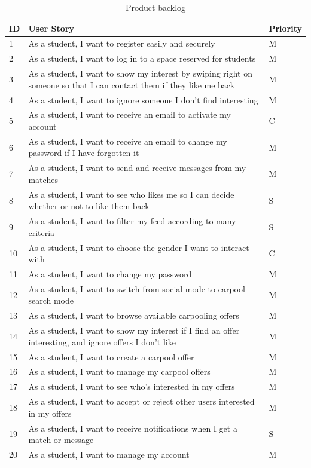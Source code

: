 \begin{table}[H]
    \centering
    \begin{tabular}{|p{0.5cm}|p{12cm}|p{2cm}|}
        \hline
ID & User Story & Priority \\
\hline
1 & As a student, I want to register easily and securely & M \\
\hline
2 & As a student, I want to log in to a space reserved for students & M \\
\hline
3 & As a student, I want to show my interest by swiping right on someone so that I can contact them if they like me back & M \\
\hline
4 & As a student, I want to ignore someone I don't find interesting & M \\
\hline
5 & As a student, I want to receive an email to activate my account & C \\
\hline
6 & As a student, I want to receive an email to change my password if I have forgotten it & M \\
\hline
7 & As a student, I want to send and receive messages from my matches & M \\
\hline
8 & As a student, I want to see who likes me so I can decide whether or not to like them back & S \\
\hline
9 & As a student, I want to filter my feed according to many criteria & S \\
\hline
10 & As a student, I want to choose the gender I want to interact with & C \\
\hline
11 & As a student, I want to change my password & M \\
\hline
12 & As a student, I want to switch from social mode to carpool search mode & M \\
\hline
13 & As a student, I want to browse available carpooling offers & M \\
\hline
14 & As a student, I want to show my interest if I find an offer interesting, and ignore offers I don't like & M \\
\hline
15 & As a student, I want to create a carpool offer & M \\
\hline
16 & As a student, I want to manage my carpool offers & M \\
\hline
17 & As a student, I want to see who's interested in my offers & M \\
\hline
18 & As a student, I want to accept or reject other users interested in my offers & M \\
\hline
19 & As a student, I want to receive notifications when I get a match or message & S \\
\hline
20 & As a student, I want to manage my account & M \\
\hline
    \end{tabular}
    \caption{Product backlog}
    \label{Tab: Product backlog}
\end{table}
